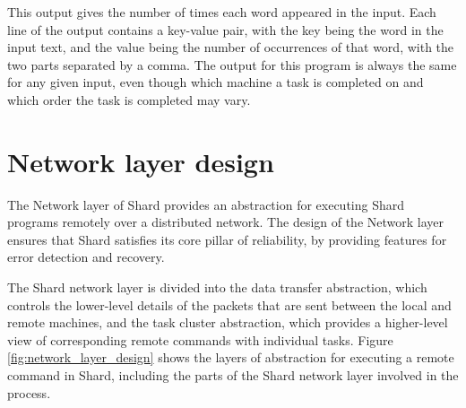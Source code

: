 \documentclass[twoside]{report}
\begin{document}
This output gives the number of times each word appeared in the input.
Each line of the output contains a key-value pair, with the key being the word in the input text, and the value being the number of occurrences of that word, with the two parts separated by a comma.
The output for this program is always the same for any given input, even though which machine a task is completed on and which order the task is completed may vary.

\section{Network layer design}


The Network layer of Shard provides an abstraction for executing Shard programs remotely over a distributed network.
The design of the Network layer ensures that Shard satisfies its core pillar of reliability, by providing features for error detection and recovery.

The Shard network layer is divided into the data transfer abstraction, which controls the lower-level details of the packets that are sent between the local and remote machines, and the task cluster abstraction, which provides a higher-level view of corresponding remote commands with individual tasks.
Figure \ref{fig:network_layer_design} shows the layers of abstraction for executing a remote command in Shard, including the parts of the Shard network layer involved in the process.
\end{document}
